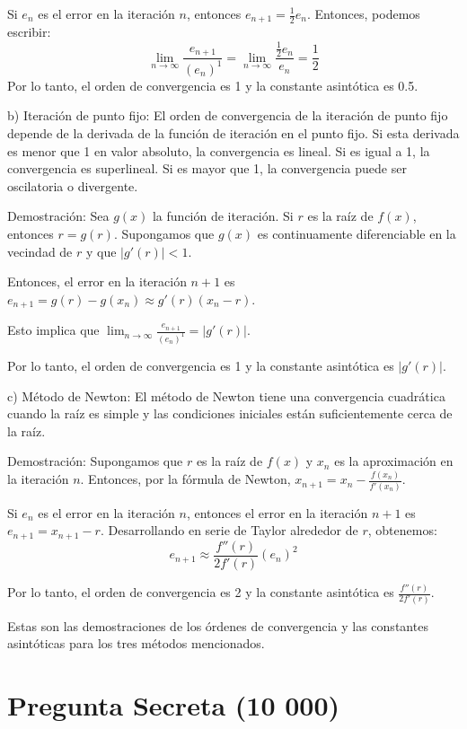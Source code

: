 \documentclass[a4paper,12pt]{article}
\begin{document}
Si \( e_n \) es el error en la iteración \( n \), entonces \( e_{n+1} = \frac{1}{2} e_n \).
Entonces, podemos escribir:
\[ \lim_{n \to \infty} \frac{e_{n+1}}{(e_n)^1} = \lim_{n \to \infty} \frac{\frac{1}{2} e_n}{e_n} = \frac{1}{2} \]
Por lo tanto, el orden de convergencia es 1 y la constante asintótica es 0.5.

b) Iteración de punto fijo:
El orden de convergencia de la iteración de punto fijo depende de la derivada de la función de iteración en el punto fijo. Si esta derivada es menor que 1 en valor absoluto, la convergencia es lineal. Si es igual a 1, la convergencia es superlineal. Si es mayor que 1, la convergencia puede ser oscilatoria o divergente.

Demostración:
Sea \( g(x) \) la función de iteración. Si \( r \) es la raíz de \( f(x) \), entonces \( r = g(r) \). Supongamos que \( g(x) \) es continuamente diferenciable en la vecindad de \( r \) y que \( |g'(r)| < 1 \).

Entonces, el error en la iteración \( n+1 \) es \( e_{n+1} = g(r) - g(x_n) \approx g'(r) (x_n - r) \).

Esto implica que \( \lim_{n \to \infty} \frac{e_{n+1}}{(e_n)^1} = |g'(r)| \).

Por lo tanto, el orden de convergencia es 1 y la constante asintótica es \( |g'(r)| \).

c) Método de Newton:
El método de Newton tiene una convergencia cuadrática cuando la raíz es simple y las condiciones iniciales están suficientemente cerca de la raíz.

Demostración:
Supongamos que \( r \) es la raíz de \( f(x) \) y \( x_n \) es la aproximación en la iteración \( n \). Entonces, por la fórmula de Newton, \( x_{n+1} = x_n - \frac{f(x_n)}{f'(x_n)} \).

Si \( e_n \) es el error en la iteración \( n \), entonces el error en la iteración \( n+1 \) es \( e_{n+1} = x_{n+1} - r \).
Desarrollando en serie de Taylor alrededor de \( r \), obtenemos:
\[ e_{n+1} \approx \frac{f''(r)}{2f'(r)} (e_n)^2 \]

Por lo tanto, el orden de convergencia es 2 y la constante asintótica es \( \frac{f''(r)}{2f'(r)} \).

Estas son las demostraciones de los órdenes de convergencia y las constantes asintóticas para los tres métodos mencionados.


\section*{Pregunta Secreta (10 000)}
\end{document}
